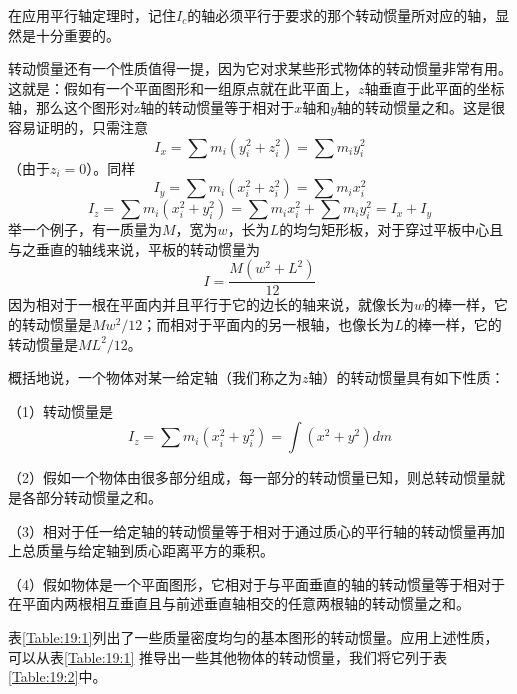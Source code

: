 在应用平行轴定理时，记住$I_c$的轴必须平行于要求的那个转动惯量所对应的轴，显然是十分重要的。

转动惯量还有一个性质值得一提，因为它对求某些形式物体的转动惯量非常有用。这就是：假如有一个平面图形和一组原点就在此平面上，$z$轴垂直于此平面的坐标轴，那么这个图形对z轴的转动惯量等于相对于$x$轴和$y$轴的转动惯量之和。这是很容易证明的，只需注意
\begin{equation*}
    I_x = \sum m_i(y_i^2 + z_i^2) = \sum m_iy_i^2
\end{equation*}
（由于$z_i=0$）。同样
\begin{equation*}
    I_y = \sum m_i(x_i^2 + z_i^2) = \sum m_ix_i^2
\end{equation*}
\begin{equation*}
    I_z = \sum m_i(x_i^2 + y_i^2) = \sum m_ix_i^2 + \sum m_iy_i^2 = I_x + I_y
\end{equation*}
举一个例子，有一质量为$M$，宽为$w$，长为$L$的均匀矩形板，对于穿过平板中心且与之垂直的轴线来说，平板的转动惯量为
\begin{equation*}
    I = \frac{M(w^2+L^2)}{12}
\end{equation*}
因为相对于一根在平面内并且平行于它的边长的轴来说，就像长为$w$的棒一样，它的转动惯量是$Mw^2/12$；而相对于平面内的另一根轴，也像长为$L$的棒一样，它的转动惯量是$ML^2/12$。

概括地说，一个物体对某一给定轴（我们称之为$z$轴）的转动惯量具有如下性质：

（1）转动惯量是
\begin{equation*}
    I_z = \sum m_i(x_i^2 + y_i^2) = \int (x^2+y^2)dm
\end{equation*}

（2）假如一个物体由很多部分组成，每一部分的转动惯量已知，则总转动惯量就是各部分转动惯量之和。

（3）相对于任一给定轴的转动惯量等于相对于通过质心的平行轴的转动惯量再加上总质量与给定轴到质心距离平方的乘积。

（4）假如物体是一个平面图形，它相对于与平面垂直的轴的转动惯量等于相对于在平面内两根相互垂直且与前述垂直轴相交的任意两根轴的转动惯量之和。

表\ref{Table:19:1}列出了一些质量密度均匀的基本图形的转动惯量。应用上述性质，可以从表\ref{Table:19:1} 推导出一些其他物体的转动惯量，我们将它列于表\ref{Table:19:2}中。

\begin{table}[H]
    \footnotesize
    \centering
    \caption{}
    \label{Table:19:1}
\end{table}


